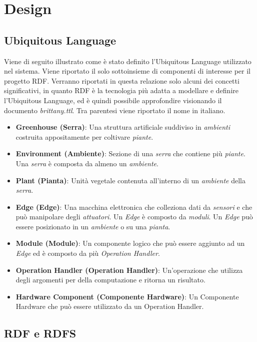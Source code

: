 \section{Design}

\subsection{Ubiquitous Language}
Viene di seguito illustrato come è stato definito l’Ubiquitous Language utilizzato nel sistema. Viene riportato il solo sottoinsieme di componenti di interesse per il progetto RDF. Verranno riportati in questa relazione solo alcuni dei concetti significativi, in quanto RDF è la tecnologia più adatta a modellare e definire l'Ubiquitous Language, ed è quindi possibile approfondire visionando il documento \textit{brittany.ttl}. Tra parentesi viene riportato il nome in italiano.

\begin{itemize}
	\item \textbf{Greenhouse (Serra)}: Una struttura artificiale suddiviso in \textit{ambienti} costruita appositamente per coltivare \textit{piante}.
	\item \textbf{Environment (Ambiente)}: Sezione di una \textit{serra} che contiene più \textit{piante}. Una \textit{serra} è composta da almeno un \textit{ambiente}.
	\item \textbf{Plant (Pianta)}: Unità vegetale contenuta all’interno di un \textit{ambiente} della \textit{serra}.
	\item \textbf{Edge (Edge)}: Una macchina elettronica che colleziona dati da \textit{sensori} e che può manipolare degli \textit{attuatori}. Un \textit{Edge} è composto da \textit{moduli}. Un \textit{Edge} può essere posizionato in un \textit{ambiente} o su una \textit{pianta}.
	\item \textbf{Module (Module)}: Un componente logico che può essere aggiunto ad un \textit{Edge} ed è composto da più \textit{Operation Handler}.
	\item \textbf{Operation Handler (Operation Handler)}: Un'operazione che utilizza degli argomenti per della computazione e ritorna un risultato.
	\item \textbf{Hardware Component (Componente Hardware)}: Un Componente Hardware che può essere utilizzato da un Operation Handler.
\end{itemize}

\subsection{RDF e RDFS}

